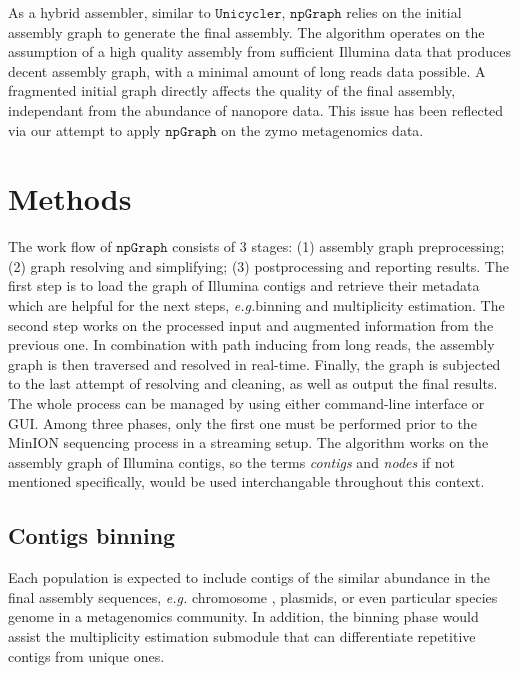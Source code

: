 \documentclass[10pt,twocolumn,twoside]{genpaper}
\newcommand{\npgraph}{$\mathtt{npGraph}$}
\newcommand{\unicycler}{$\mathtt{Unicycler}$}
\newcommand{\EG}{\emph{e.g.}}
\begin{document}
As a hybrid assembler, similar to \unicycler{}, \npgraph{} relies on the initial assembly graph to generate the final assembly. The algorithm operates on the assumption of a high quality assembly from sufficient Illumina data that produces decent assembly graph, with a minimal amount of long reads data possible. A fragmented initial graph directly affects the quality of the final assembly, independant from the abundance of nanopore data. This issue has been reflected via our attempt to apply \npgraph{} on the zymo metagenomics data.



\section*{Methods}

The work flow of \npgraph{} consists of 3 stages: (1) assembly graph preprocessing; (2) graph resolving and simplifying; (3) postprocessing and reporting results. 
The first step is to load the graph of Illumina contigs and retrieve their metadata which are helpful for the next steps, \EG binning and multiplicity estimation.
The second step works on the processed input and augmented information from the previous one. In combination with path inducing from long reads, the assembly graph is then traversed and resolved in real-time.
Finally, the graph is subjected to the last attempt of resolving and cleaning, as well as output the final results. The whole process can be managed by using either command-line interface or GUI.
Among three phases, only the first one must be performed prior to the MinION sequencing process in a streaming setup.
The algorithm works on the assembly graph of Illumina contigs, so the terms \emph{contigs} and \emph{nodes} if not mentioned specifically, would be used interchangable throughout this context.
\subsection*{Contigs binning}
Each population is expected to include contigs of the similar abundance in the final assembly sequences, \EG{} chromosome , plasmids, or even particular species genome in a metagenomics community. In addition, the binning phase would assist the multiplicity estimation submodule that can differentiate repetitive contigs from unique ones. 
\end{document}
